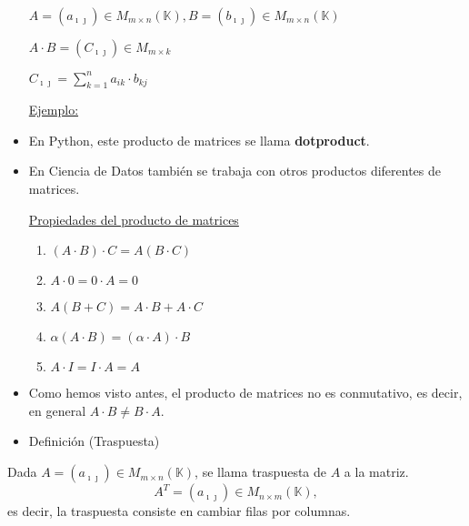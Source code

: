 \documentclass[12pt]{article}
\begin{document}
\begin{itemize}[label=$\longrightarrow$]
$A=(a_{\imath\jmath  })\in M_{m\times n}(\mathbb{K}),B=(b_{\imath\jmath  })\in
M_{m\times n}(\mathbb{K})$

          $A\cdot B=(C_{\imath\jmath  })\in M_{m\times k}$

          $C_{\imath\jmath  }=\sum_{k=1}^{n}a_{ik}\cdot b_{kj}$

          \underline{Ejemplo:}

\item[\textbullet] En Python, este producto de matrices se llama
\textbf{dotproduct}.
\item[\textbullet] En Ciencia de Datos también se trabaja con
otros productos diferentes de matrices.

        \underline{Propiedades del producto de matrices}
        \begin{enumerate}
            \item $(A\cdot B)\cdot C=A(B\cdot C)$
            \item $A\cdot 0=0\cdot A=0$
            \item $A(B+C)=A\cdot B+A\cdot C$
            \item $\alpha(A\cdot B)=(\alpha \cdot A)\cdot B$
            \item $A\cdot I=I\cdot A=A$
        \end{enumerate}
\item Como hemos visto antes, el producto de matrices no es
conmutativo, es decir, en general $A\cdot B\neq B\cdot A$.
\end{itemize}
\begin{itemize}[label=\color{red}\textbullet, leftmargin=*]
    \item \color{lightblue} Definición (Traspuesta)
\end{itemize}
Dada $A=(a_{\imath\jmath  })\in M_{m\times n}(\mathbb{K})$, se llama
traspuesta de $A$ a la matriz. \[A^T=(a_{\imath\jmath  })\in M_{n\times
m}(\mathbb{K}),\]es decir, la traspuesta consiste en cambiar
filas por columnas.
\end{document}
